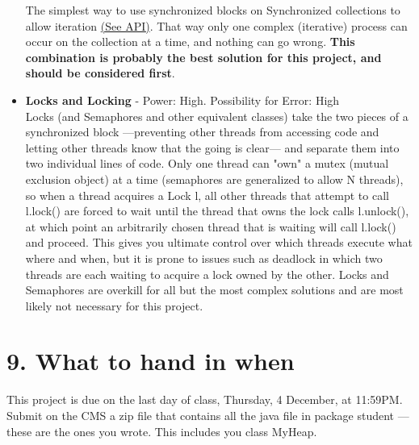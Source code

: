 \documentclass[11pt]{article}
\begin{document}
\begin{itemize}
The simplest way to use synchronized blocks on Synchronized collections to allow iteration \href{http://docs.oracle.com/javase/7/docs/api/java/util/Collections.html\#synchronizedCollection(java.util.Collection)}{({\color{blue}\underline{See API}})}. That way only one complex (iterative) process can occur on the collection at a time, and nothing can go wrong. \textbf{This combination is probably the best solution for this project, and should be considered first}.
\item \textbf{Locks and Locking} - Power: High. Possibility for Error: High\\
Locks (and Semaphores and other equivalent classes) take the two pieces of a synchronized block ---preventing other threads from accessing code and letting other threads know that the going is clear--- and separate them into two individual lines of code. Only one thread can "own" a mutex (mutual exclusion object) at a time (semaphores are generalized to allow N threads), so when a thread acquires a Lock l, all other threads that attempt to call l.lock() are forced to wait until the thread that owns the lock calls l.unlock(), at which point an arbitrarily chosen thread that is waiting will call l.lock() and proceed. This gives you ultimate control over which threads execute what where and when, but it is  prone to issues such as deadlock in which two threads are each waiting to acquire a lock owned by the other. Locks and Semaphores are overkill for all but the most complex solutions and are most likely not necessary for this project. 
\end{itemize}

\section{9. What to hand in when}
This project is due on the last day of class, Thursday, 4 December, at 11:59PM.
Submit on the CMS a zip file that contains all the java file in package student ---these are the ones you wrote.
This includes you class MyHeap.
\\
\end{document}
